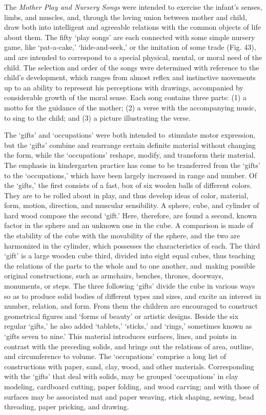 \documentclass[
]{book}
\begin{document}
The \emph{Mother Play and Nursery Songs} were intended to exercise the infant's senses, limbs, and muscles, and, through the loving union between mother and child, draw both into intelligent and agreeable relations with the common objects of life about them. The fifty `play songs' are each connected with some simple nursery game, like `pat-a-cake,' `hide-and-seek,' or the imitation of some trade (Fig. 43), and are intended to correspond to a special physical, mental, or moral need of the child. The selection and order of the songs were determined with reference to the child's development, which ranges from almost reflex and instinctive movements up to an ability to represent his perceptions with drawings, accompanied by considerable growth of the moral sense. Each song contains three parts: (1) a motto for the guidance of the mother; (2) a verse with the accompanying music, to sing to the child; and (3) a picture illustrating the verse.

The `gifts' and `occupations' were both intended to~stimulate motor expression, but the `gifts' combine and rearrange certain definite material without changing the form, while the `occupations' reshape, modify, and transform their material. The emphasis in kindergarten practice has come to be transferred from the `gifts' to the `occupations,' which have been largely increased in range and number. Of the `gifts,' the first consists of a fast, box of six woolen balls of different colors. They are to be rolled about in play, and thus develop ideas of color, material, form, motion, direction, and muscular sensibility. A sphere, cube, and cylinder of hard wood compose the second `gift.' Here, therefore, are found a second, known factor in the sphere and an unknown one in the cube. A comparison is made of the stability of the cube with the movability of the sphere, and the two are harmonized in the cylinder, which possesses the characteristics of each. The third `gift' is a large wooden cube third, divided into eight equal cubes, thus teaching the relations of the parts to the whole and to one another, and~making possible original constructions, such as armchairs, benches, thrones, doorways, monuments, or steps. The three following `gifts' divide the cube in various ways so as to produce solid bodies of different types and sizes, and excite an interest in number, relation, and form. From them the children are encouraged to construct geometrical figures and `forms of beauty' or artistic designs. Beside the six regular `gifts,' he also added `tablets,' `sticks,' and `rings,' sometimes known as `gifts seven to nine.' This material introduces surfaces, lines, and points in contrast with the preceding solids, and brings out the relations of area, outline, and circumference to volume. The `occupations' comprise a long list of constructions with paper, sand, clay, wood, and other materials. Corresponding with the `gifts' that deal with solids, may be grouped `occupations' in clay modeling, cardboard cutting, paper folding, and wood carving; and with those of surfaces may be associated mat and paper weaving, stick shaping, sewing, bead threading, paper pricking, and drawing.
\end{document}
